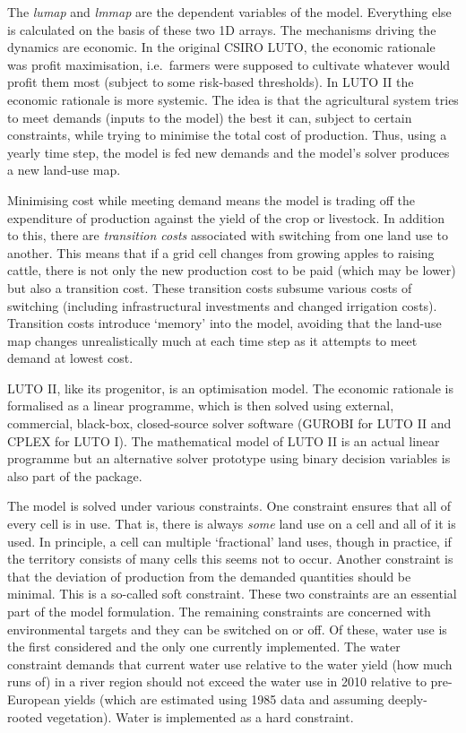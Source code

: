 \documentclass[12pt,a4paper,twoside]{article}
\begin{document}
The \emph{lumap} and \emph{lmmap} are the dependent variables of the model. Everything else is calculated on the basis of these two 1D arrays. The mechanisms driving the dynamics are economic. In the original CSIRO LUTO, the economic rationale was profit maximisation, i.e.\ farmers were supposed to cultivate whatever would profit them most (subject to some risk-based thresholds). In LUTO II the economic rationale is more systemic. The idea is that the agricultural system tries to meet demands (inputs to the model) the best it can, subject to certain constraints, while trying to minimise the total cost of production. Thus, using a yearly time step, the model is fed new demands and the model's solver produces a new land-use map.

Minimising cost while meeting demand means the model is trading off the expenditure of production against the yield of the crop or livestock. In addition to this, there are \emph{transition costs} associated with switching from one land use to another. This means that if a grid cell changes from growing apples to raising cattle, there is not only the new production cost to be paid (which may be lower) but also a transition cost. These transition costs subsume various costs of switching (including infrastructural investments and changed irrigation costs). Transition costs introduce `memory' into the model, avoiding that the land-use map changes unrealistically much at each time step as it attempts to meet demand at lowest cost.

LUTO II, like its progenitor, is an optimisation model. The economic rationale is formalised as a linear programme, which is then solved using external, commercial, black-box, closed-source solver software (GUROBI for LUTO II and CPLEX for LUTO I). The mathematical model of LUTO II is an actual linear programme but an alternative solver prototype using binary decision variables is also part of the package.

The model is solved under various constraints. One constraint ensures that all of every cell is in use. That is, there is always \emph{some} land use on a cell and all of it is used. In principle, a cell can multiple `fractional' land uses, though in practice, if the territory consists of many cells this seems not to occur. Another constraint is that the deviation of production from the demanded quantities should be minimal. This is a so-called soft constraint. These two constraints are an essential part of the model formulation. The remaining constraints are concerned with environmental targets and they can be switched on or off. Of these, water use is the first considered and the only one currently implemented. The water constraint demands that current water use relative to the water yield (how much runs of) in a river region should not exceed the water use in 2010 relative to pre-European yields (which are estimated using 1985 data and assuming deeply-rooted vegetation). Water is implemented as a hard constraint.
\end{document}
